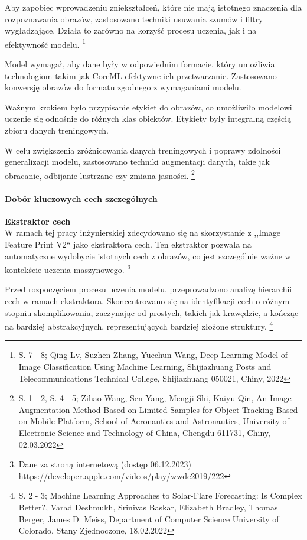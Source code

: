 \documentclass[12pt, a4paper, twoside, openany]{book}
\newcommand{\forceindent}{\leavevmode{\parindent=1.3em\indent}}
\begin{document}
Aby zapobiec wprowadzeniu zniekształceń, które nie mają istotnego znaczenia dla rozpoznawania obrazów, zastosowano techniki usuwania szumów i filtry wygładzające.
Działa to zarówno na korzyść procesu uczenia, jak i na efektywność modelu. \footnote{S. 7 - 8; Qing Lv, Suzhen Zhang, Yuechun Wang, Deep Learning Model of Image Classification Using
Machine Learning, Shijiazhuang Posts and Telecommunications Technical College, Shijiazhuang 050021, Chiny, 2022}

Model wymagał, aby dane były w odpowiednim formacie, który umożliwia technologiom takim jak CoreML efektywne ich przetwarzanie.
Zastosowano konwersję obrazów do formatu zgodnego z wymaganiami modelu.

Ważnym krokiem było przypisanie etykiet do obrazów, co umożliwiło modelowi uczenie się odnośnie do różnych klas obiektów.
Etykiety były integralną częścią zbioru danych treningowych.

W celu zwiększenia zróżnicowania danych treningowych i poprawy zdolności generalizacji modelu, zastosowano techniki augmentacji danych, takie jak obracanie, odbijanie lustrzane czy zmiana jasności. \footnote{ S. 1 - 2, S. 4 - 5; Zihao Wang, Sen Yang, Mengji Shi, Kaiyu Qin, An Image Augmentation Method Based on Limited Samples for Object Tracking Based on Mobile Platform, School of Aeronautics and Astronautics, University of Electronic Science and Technology of China, Chengdu 611731, Chiny, 02.03.2022 }

\paragraph{Dobór kluczowych cech szczególnych\\}
\forceindent \textbf{ Ekstraktor cech\\}
\indent W ramach tej pracy inżynierskiej zdecydowano się na skorzystanie z ,,Image Feature Print V2`` jako ekstraktora cech.
Ten ekstraktor pozwala na automatyczne wydobycie istotnych cech z obrazów, co jest szczególnie ważne w kontekście uczenia maszynowego. \footnote{Dane za stroną internetową (dostęp 06.12.2023) \url{https://developer.apple.com/videos/play/wwdc2019/222}}

Przed rozpoczęciem procesu uczenia modelu, przeprowadzono analizę hierarchii cech w ramach ekstraktora.
Skoncentrowano się na identyfikacji cech o różnym stopniu skomplikowania, zaczynając od prostych, takich jak krawędzie, a kończąc na bardziej abstrakcyjnych, reprezentujących bardziej złożone struktury. \footnote{ S. 2 - 3; Machine Learning Approaches to Solar-Flare Forecasting: Is Complex Better?, Varad Deshmukh, Srinivas Baskar, Elizabeth Bradley, Thomas Berger, James D. Meiss, Department of Computer Science University of Colorado, Stany Zjednoczone, 18.02.2022}
\end{document}
